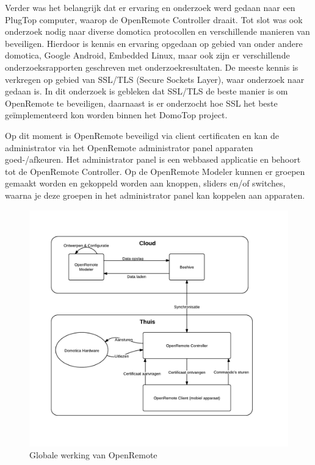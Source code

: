 \documentclass[]{article}
\begin{document}
Verder was het belangrijk dat er ervaring en onderzoek werd gedaan naar een PlugTop computer, waarop de OpenRemote Controller
draait. Tot slot was ook onderzoek nodig naar diverse domotica
protocollen en verschillende manieren van beveiligen. Hierdoor is kennis en
ervaring opgedaan op gebied van onder andere domotica, Google Android, Embedded
Linux, maar ook zijn er verschillende onderzoeksrapporten geschreven met
onderzoekresultaten. De meeste kennis is verkregen op gebied van SSL/TLS (Secure Sockets Layer),
waar onderzoek naar gedaan is. In dit onderzoek is gebleken dat SSL/TLS
de beste manier is om OpenRemote te beveiligen, daarnaast is er onderzocht hoe
SSL het beste ge\"implementeerd kon worden binnen het DomoTop project. 

Op dit moment is OpenRemote beveiligd via client certificaten en kan de
administrator via het OpenRemote administrator panel apparaten goed-/afkeuren.
Het administrator panel is een webbased applicatie en behoort tot de OpenRemote
Controller. Op de OpenRemote Modeler kunnen er groepen gemaakt worden en
gekoppeld worden aan knoppen, sliders en/of switches, waarna je deze groepen in
het administrator panel kan koppelen aan apparaten.

\begin{figure}[htpb]
   \begin{center}
     \includegraphics[width=\textwidth]{GlobalOR.pdf}
   \end{center}
   \caption{Globale werking van OpenRemote}
   \label{global}
\end{figure}
\end{document}
